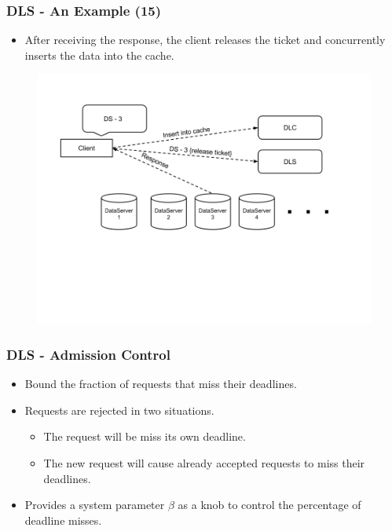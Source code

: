 \documentclass{beamer}
\begin{document}
\begin{frame}
  \frametitle{DLS - An Example (15)}
  \begin{itemize}
  \item After receiving the response, the client releases
    the ticket and concurrently inserts the data into the cache.
  \end{itemize}
  \begin{figure}
    \begin{center}
      \centerline{\includegraphics[scale=0.35]{img/DLS_Example12.png}}
    \end{center}
  \end{figure}
\end{frame}


\begin{frame}
  \frametitle{DLS - Admission Control}
  \begin{itemize}
  \item Bound the fraction of requests that miss their deadlines.
  \item Requests are rejected in two situations.
    \begin{itemize}
    \item The request will be miss its own deadline.
    \item The new request will cause already accepted requests to miss their deadlines.
    \end{itemize}
  \item Provides a system parameter $\beta$ as a knob to control the percentage
    of deadline misses.
  \end{itemize}
\end{frame}
\end{document}
